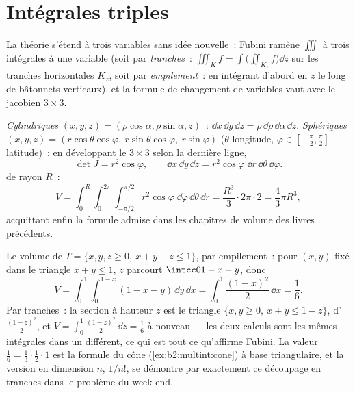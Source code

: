 \section{Intégrales triples}

La théorie s'étend à trois variables sans idée nouvelle~: Fubini
ramène $\iiint$ à trois intégrales à une variable (soit par
\emph{tranches}~: $\iiint_K f = \int\bigl(\iint_{K_z}
f\bigr)\dd z$ sur les tranches horizontales $K_z$, soit par
\emph{empilement}~: en intégrant d'abord en $z$ le long de bâtonnets
verticaux), et la formule de changement de variables vaut avec le
jacobien $3 \times 3$.

\begin{example}\label{ex:b2:multint:spherical}
\leavevmode\par\noindent
\emph{Cylindriques} $(x, y, z) = (\rho\cos\alpha, \rho\sin\alpha,
z)$~: $\dd x\,\dd y\,\dd z = \rho\,\dd\rho\,\dd\alpha\,\dd z$.
\emph{Sphériques} $(x, y, z) = (r\cos\theta\cos\varphi,\
r\sin\theta\cos\varphi,\ r\sin\varphi)$ ($\theta$ longitude,
$\varphi \in [-\frac\pi2, \frac\pi2]$ latitude)~: en développant le $3
\times 3$ \omterm{def:b2:linalg:det}{déterminant} selon la dernière ligne,
\[
\det J = r^2\cos\varphi ,
\qquad
\dd x\,\dd y\,\dd z
= r^2\cos\varphi\;\dd r\,\dd\theta\,\dd\varphi .
\]
 de rayon $R$~:
\[
V = \int_0^R\!\!\int_0^{2\pi}\!\!\int_{-\pi/2}^{\pi/2}
r^2\cos\varphi\;\dd\varphi\,\dd\theta\,\dd r
= \frac{R^3}{3}\cdot 2\pi \cdot 2
= \boxed{\frac43\pi R^3} ,
\]
acquittant enfin la formule admise dans les chapitres de volume des
livres précédents.
\end{example}

\begin{example}
\label{ex:b2:multint:tetra}
Le volume de $T = \{x, y, z \geq 0,\ x + y + z \leq 1\}$, par
empilement~: pour $(x, y)$ fixé dans le triangle $x + y \leq 1$,
$z$ parcourt $\intcc0{1 - x - y}$, donc
\[
V = \int_0^1\!\!\int_0^{1-x}(1 - x - y)\,\dd y\,\dd x
= \int_0^1\frac{(1 - x)^2}{2}\,\dd x = \frac16 .
\]
Par tranches~: la section à hauteur $z$ est le triangle $\{x, y
\geq 0,\ x + y \leq 1 - z\}$, d' $\frac{(1-z)^2}2$, et
$V = \int_0^1\frac{(1-z)^2}2\,\dd z = \frac16$ à nouveau --- les
deux calculs sont les mêmes intégrales dans un  différent,
ce qui est tout ce qu'affirme Fubini. La valeur $\frac16 =
\frac13\cdot\frac12\cdot1$ est la formule du cône
(\cref{ex:b2:multint:cone}) à base triangulaire, et la
version en dimension $n$, $1/n!$, se démontre par exactement ce
découpage en tranches dans le problème du week-end.
\end{example}

